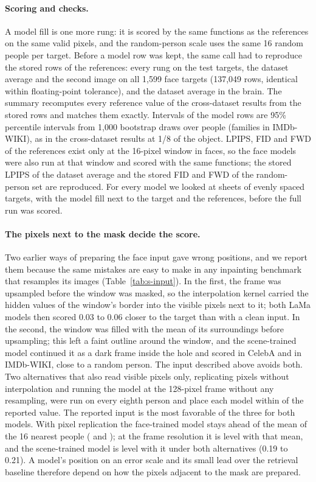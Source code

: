 \paragraph{Scoring and checks.}
A model fill is one more rung: it is scored by the same functions as the references on the same valid pixels, and the random-person scale uses the same 16 random people per target.
Before a model row was kept, the same call had to reproduce the stored rows of the references: every rung on the test targets, the dataset average and the second image on all 1{,}599 face targets (137{,}049 rows, identical within floating-point tolerance), and the dataset average in the brain.
The summary recomputes every reference value of the cross-dataset results from the stored rows and matches them exactly.
Intervals of the model rows are 95\% percentile intervals from 1{,}000 bootstrap draws over people (families in IMDb-WIKI), as in the cross-dataset results at 1/8 of the object.
\Ac{LPIPS}, \ac{FID} and \ac{FWD} of the references exist only at the 16-pixel window in faces, so the face models were also run at that window and scored with the same functions; the stored \ac{LPIPS} of the dataset average and the stored \ac{FID} and \ac{FWD} of the random-person set are reproduced.
For every model we looked at sheets of evenly spaced targets, with the model fill next to the target and the references, before the full run was scored.

\paragraph{The pixels next to the mask decide the score.}
Two earlier ways of preparing the face input gave wrong positions, and we report them because the same mistakes are easy to make in any inpainting benchmark that resamples its images (Table~\ref{tab:s-input}).
In the first, the frame was upsampled before the window was masked, so the interpolation kernel carried the hidden values of the window's border into the visible pixels next to it; both LaMa models then scored 0.03 to 0.06 closer to the target than with a clean input.
In the second, the window was filled with the mean of its surroundings before upsampling; this left a faint outline around the window, and the scene-trained model continued it as a dark frame inside the hole and scored \mfSensLamaPlacesCelebaVtwo{} in CelebA and \mfSensLamaPlacesImdbVtwo{} in IMDb-WIKI, close to a random person.
The input described above avoids both.
Two alternatives that also read visible pixels only, replicating pixels without interpolation and running the model at the 128-pixel frame without any resampling, were run on every eighth person and place each model within \mfSensSpread{} of the reported value.
The reported input is the most favorable of the three for both models.
With pixel replication the face-trained model stays ahead of the mean of the 16 nearest people (\mfSensLamaHqCelebaNearest{} and \mfSensLamaHqImdbNearest{}); at the frame resolution it is level with that mean, and the scene-trained model is level with it under both alternatives (0.19 to 0.21).
A model's position on an error scale and its small lead over the retrieval baseline therefore depend on how the pixels adjacent to the mask are prepared.

